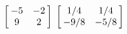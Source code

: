 {$\left[\hskip -3pt \begin{array}{cc} -5&-2\\  9&2\end {array} \hskip -3pt
 \right] $
 }
{$\left[\hskip -3pt \begin{array}{cc} 1/4&1/4\\  -9/8&-5/8\end {array} \hskip -3pt
 \right] $}

